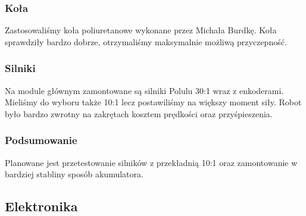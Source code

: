 \documentclass[12pt,a4paper]{article}
\begin{document}

\subsubsection{Koła}

Zastosowaliśmy koła poliuretanowe wykonane przez Michała Burdkę. Koła sprawdziły bardzo dobrze, otrzymaliśmy maksymalnie możliwą przyczepność.

\subsubsection{Silniki}

Na module głównym zamontowane są silniki Polulu 30:1 wraz z enkoderami. Mieliśmy do wyboru także 10:1 lecz postawiliśmy na większy moment siły. Robot było bardzo zwrotny na zakrętach kosztem prędkości oraz przyśpieszenia.

\subsubsection{Podsumowanie}

Planowane jest przetestowanie silników z przekładnią 10:1 oraz zamontowanie w bardziej stabliny sposób akumulatora.

\subsection{Elektronika}
\end{document}
